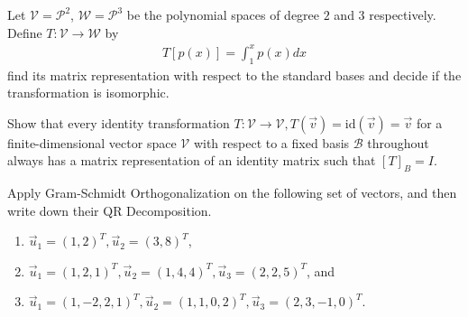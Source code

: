 \begin{Exercise}
Let $\mathcal{V} = \mathcal{P}^2$, $\mathcal{W} = \mathcal{P}^3$ be the polynomial spaces of degree $2$ and $3$ respectively. Define $T: \mathcal{V} \to \mathcal{W}$ by
\begin{align*}
T[p(x)] = \int_1^x p(x) dx
\end{align*}
find its matrix representation with respect to the standard bases and decide if the transformation is isomorphic.
\end{Exercise}

\begin{Exercise}
Show that every identity transformation $T: \mathcal{V} \to \mathcal{V}, T(\vec{v}) = \text{id}(\vec{v}) = \vec{v}$ for a finite-dimensional vector space $\mathcal{V}$ with respect to a fixed basis $\mathcal{B}$ throughout always has a matrix representation of an identity matrix such that $[T]_B = I$. 
\end{Exercise}

\begin{Exercise}
Apply Gram-Schmidt Orthogonalization on the following set of vectors, and then write down their QR Decomposition.
\begin{enumerate}[label=(\alph*)]
\item $\vec{u}_1 = (1,2)^T, \vec{u}_2 = (3,8)^T$,
\item $\vec{u}_1 = (1,2,1)^T, \vec{u}_2 = (1,4,4)^T, \vec{u}_3 = (2,2,5)^T$, and
\item $\vec{u}_1 = (1,-2,2,1)^T, \vec{u}_2 = (1,1,0,2)^T, \vec{u}_3 = (2,3,-1,0)^T$.
\end{enumerate}  
\end{Exercise}